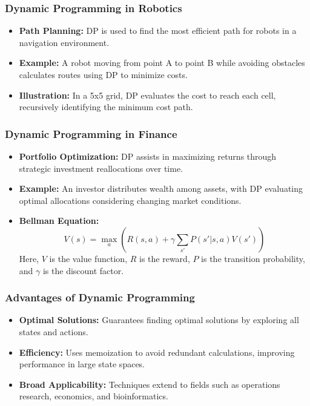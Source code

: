 \documentclass{beamer}
\begin{document}
\begin{frame}[fragile]
    \frametitle{Dynamic Programming in Robotics}
    
    \begin{itemize}
        \item \textbf{Path Planning:} 
        DP is used to find the most efficient path for robots in a navigation environment.
        \item \textbf{Example:} 
        A robot moving from point A to point B while avoiding obstacles calculates routes using DP to minimize costs.
        \item \textbf{Illustration:} 
        In a 5x5 grid, DP evaluates the cost to reach each cell, recursively identifying the minimum cost path.
    \end{itemize}
\end{frame}

\begin{frame}[fragile]
    \frametitle{Dynamic Programming in Finance}
    
    \begin{itemize}
        \item \textbf{Portfolio Optimization:} 
        DP assists in maximizing returns through strategic investment reallocations over time.
        \item \textbf{Example:} 
        An investor distributes wealth among assets, with DP evaluating optimal allocations considering changing market conditions.
        \item \textbf{Bellman Equation:} 
        \begin{equation}
            V(s) = \max_a \left( R(s, a) + \gamma \sum_{s'} P(s'|s, a)V(s') \right)
        \end{equation}
        Here, \(V\) is the value function, \(R\) is the reward, \(P\) is the transition probability, and \(\gamma\) is the discount factor.
    \end{itemize}
\end{frame}

\begin{frame}[fragile]
    \frametitle{Advantages of Dynamic Programming}
    
    \begin{itemize}
        \item \textbf{Optimal Solutions:} 
        Guarantees finding optimal solutions by exploring all states and actions.
        \item \textbf{Efficiency:} 
        Uses memoization to avoid redundant calculations, improving performance in large state spaces.
        \item \textbf{Broad Applicability:} 
        Techniques extend to fields such as operations research, economics, and bioinformatics.
    \end{itemize}
\end{frame}
\end{document}
